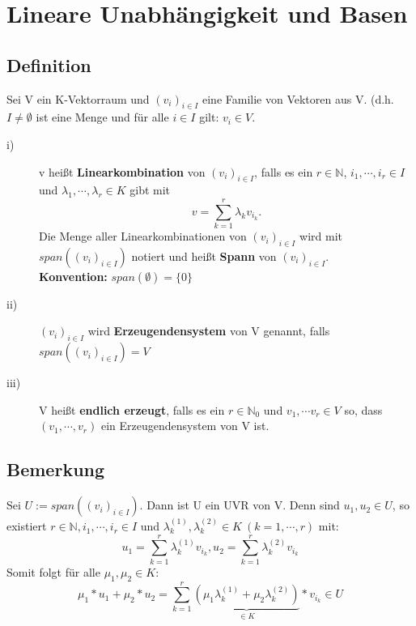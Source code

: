 \documentclass{scrbook}
\begin{document}
\chapter{Lineare Unabhängigkeit und Basen}
\section{Definition}
Sei V ein K-Vektorraum und \((v_i)_{i\in I}\) eine Familie von Vektoren aus V. (d.h. \( I \neq \emptyset\) ist eine Menge und für alle \(i\in I\) gilt: \(v_i \in V\).
\begin{description}
\item[i)] v heißt \textbf{Linearkombination} von \((v_i)_{i\in I}\), falls es ein \(r \in \mathbb{N}\), \(i_1,\cdots,i_r \in I\) und \(\lambda_1,\cdots , \lambda_r \in K\) gibt mit \[v=\sum^{r}_{k=1}\lambda_k v_{i_k}.\]
Die Menge aller Linearkombinationen von \((v_i)_{i\in I}\) wird mit \(span((v_i)_{i\in I})\) notiert und heißt \textbf{Spann} von \((v_i)_{i\in I}\).\\
\textbf{Konvention:} \(span(\emptyset)=\{0\}\)
\item[ii)] \((v_i)_{i\in I}\) wird \textbf{Erzeugendensystem} von V genannt, falls  \(span((v_i)_{i\in I})= V\)
\item[iii)] V heißt \textbf{endlich erzeugt}, falls es ein \(r\in \mathbb{N}_0\) und \(v_1,\cdots v_r\in V\) so, dass \((v_1,\cdots , v_r)\) ein Erzeugendensystem von V ist.
\end{description}
\section{Bemerkung}
Sei \(U:=span((v_i)_{i\in I})\). Dann ist U ein UVR von V. Denn sind \(u_1,u_2 \in U\), so existiert \(r\in \mathbb{N}, i_1,\cdots , i_r \in I\) und \(\lambda^{(1)}_k,\lambda^{(2)}_k \in K \ (k=1,\cdots , r)\) mit:
\[
u_1=\sum^r_{k=1} \lambda^{(1)}_k v_{i_k},u_2=\sum^r_{k=1} \lambda^{(2)}_k v_{i_k}
\]
Somit folgt für alle \(\mu_1,\mu_2 \in K\):
\[
\mu_1 * u_1+ \mu_2 * u_2= \sum^r_{k=1} \underbrace{(\mu_1 \lambda^{(1)}_k + \mu_2 \lambda^{(2)}_k)}_{\in K} * v_{i_k} \in U
\]
\end{document}

